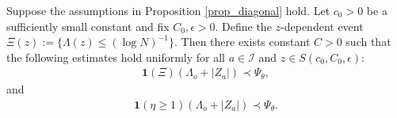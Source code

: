 \begin{lemma}\label{Z_lemma}
Suppose the assumptions in Proposition \ref{prop_diagonal} hold. Let $c_0>0$ be a sufficiently small constant and fix $C_0, \epsilon >0$. Define the $z$-dependent event $\Xi(z):=\{\Lambda(z) \le (\log N)^{-1}\}$. Then there exists constant $C>0$ such that the following estimates hold uniformly for all $a\in \mathcal I$ and $z\in S(c_0,C_0,\epsilon)$:
\begin{align}
{\mathbf 1}(\Xi)\left(\Lambda_o + |Z_{a}|\right) \prec \Psi_\theta, \label{Zestimate1}
\end{align}
and 
\begin{align}
{\mathbf 1}\left(\eta \ge 1 \right)\left(\Lambda_o + |Z_{a}|\right)\prec \Psi_\theta. \label{Zestimate2}
\end{align}
\end{lemma}

